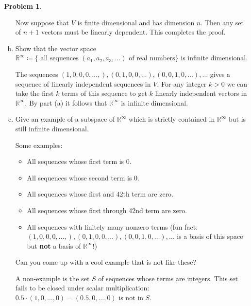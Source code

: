 \documentclass[11pt,oneside]{amsart}
\theoremstyle{definition}
\newtheorem{problem}{Problem}
\newcommand{\bR}{\mathbb{R}}
\begin{document}
\begin{problem}
\begin{enumerate}[(a)]
\begin{solution}
                Now suppose that $V$ is finite dimensional and has dimension $n$. Then any set of $n+1$ vectors must be linearly dependent. This completes the proof.
            \end{solution}
            \item Show that the vector space $\bR^\infty\coloneqq\{\text{ all sequences }(a_1,a_2,a_3,\dots)\text{ of real numbers}\}$ is infinite dimensional.
            \begin{solution}
                The sequences $(1,0,0,0,\dots,), (0,1,0,0,\dots), (0,0,1,0,\dots), \ldots$ gives a sequence of linearly independent sequences in $V$. For any integer $k>0$ we can take the first $k$ terms of this sequence to get $k$ linearly independent vectors in $\bR^\infty$. By part (a) it follows that $\bR^\infty$ is infinite dimensional.
            \end{solution}
            \item Give an example of a subspace of $\bR^\infty$ which is strictly contained in $\bR^\infty$ but is still infinite dimensional.
            \begin{solution}
                Some examples:
                \begin{itemize}
                    \item All sequences whose first term is 0.
                    \item All sequences whose second term is 0.
                    \item All sequences whose first and 42th term are zero.
                    \item All sequences whose first through 42nd term are zero.
                    \item All sequences with finitely many nonzero terms (fun fact: $(1,0,0,0,\dots,), (0,1,0,0,\dots), (0,0,1,0,\dots), \ldots$ is a basis of this space but \textbf{not} a basis of $\bR^\infty$!)
                \end{itemize}
                Can you come up with a cool example that is not like these?

                A non-example is the set $S$ of sequences whose terms are integers. This set fails to be closed under scalar multiplication: $0.5\cdot (1,0,\dots,0)=(0.5,0,\dots,0)$ is not in $S$.
            \end{solution}
        \end{enumerate}
    \end{problem}
\end{document}
